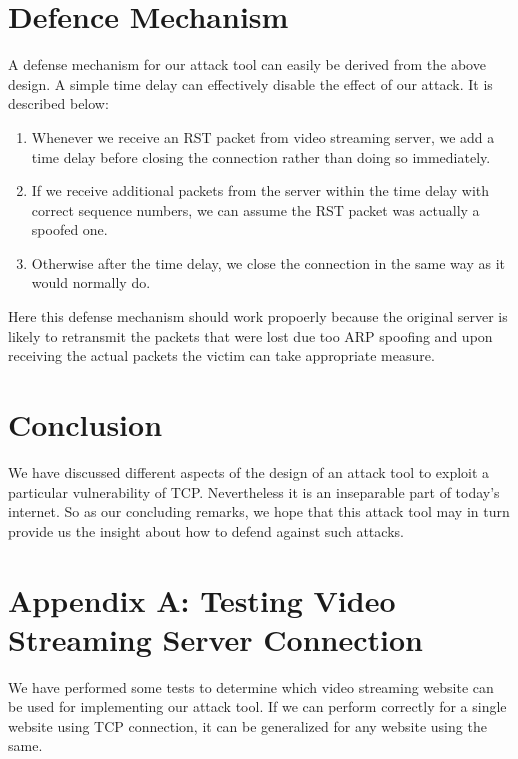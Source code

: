 \documentclass[14pt]{extarticle}
\begin{document}
\section{Defence Mechanism}
    A defense mechanism for our attack tool can easily be derived from the above design. A simple time delay can effectively disable the effect of our attack. It is described below:
    
    \begin{enumerate}
        \item Whenever we receive an RST packet from video streaming server, we add a time delay before closing the connection rather than doing so immediately.
        \item If we receive additional packets from the server within the time delay with correct sequence numbers, we can assume the RST packet was actually a spoofed one.
        \item Otherwise after the time delay, we close the connection in the same way as it would normally do.
    \end{enumerate}
    
    Here this defense mechanism should work propoerly because the original server is likely to retransmit the packets that were lost due too ARP spoofing and upon receiving the actual packets the victim can take appropriate measure.
    
\section{Conclusion}
    We have discussed different aspects of the design of an attack tool to exploit a particular vulnerability of TCP. Nevertheless it is an inseparable part of today's internet. So as our concluding remarks, we hope that this attack tool may in turn provide us the insight about how to defend against such attacks.
    

\section{Appendix A: Testing Video Streaming Server Connection}
    \label{apx:test_server}
    We have performed some tests to determine which video streaming website can be used for implementing our attack tool. If we can perform correctly for a single website using TCP connection, it can be generalized for any website using the same.
    
\end{document}
